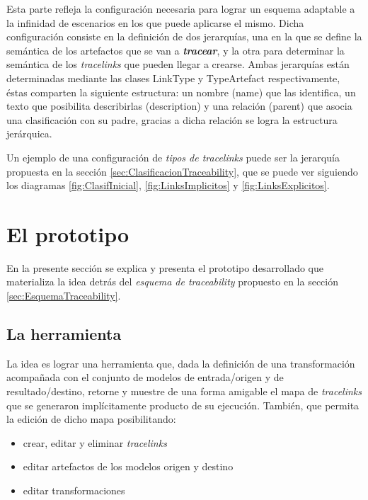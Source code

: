 \documentclass[a4paper,12pt,twoside,spanish,openright]{book}
\begin{document}
Esta parte refleja la configuración necesaria para lograr un esquema adaptable a la infinidad de escenarios en los que puede aplicarse el mismo. Dicha configuración consiste en la definición de dos jerarquías, una en la que se define la semántica de los artefactos que se van a \textit{\textbf{tracear}}, y la otra para determinar la semántica de los \textit{tracelinks} que pueden llegar a crearse. Ambas jerarquías están determinadas mediante las clases \textsf{LinkType} y \textsf{TypeArtefact} respectivamente, éstas comparten la siguiente estructura: un nombre (\textsf{name}) que las identifica, un texto que posibilita describirlas (\textsf{description}) y una relación (\textsf{parent}) que asocia una clasificación con su padre, gracias a dicha relación se logra la estructura jerárquica.

Un ejemplo de una configuración de \textit{tipos de tracelinks} puede ser la jerarquía propuesta en la sección \ref{sec:ClasificacionTraceability}, que se puede ver siguiendo los diagramas \ref{fig:ClasifInicial}, \ref{fig:LinksImplicitos} y \ref{fig:LinksExplicitos}.




\section{El prototipo}

En la presente sección se explica y presenta el prototipo desarrollado que materializa la idea detrás del \textit{esquema de traceability} propuesto en la sección \ref{sec:EsquemaTraceability}.


\subsection{La herramienta}

La idea es lograr una herramienta que, dada la definición de una transformación acompañada con el conjunto de modelos de entrada/origen y de resultado/destino, retorne y muestre de una forma amigable el mapa de \textit{tracelinks} que se generaron implícitamente producto de su ejecución. También, que permita la edición de dicho mapa posibilitando:
\begin{itemize}
\item crear, editar y eliminar \textit{tracelinks}
\item editar artefactos de los modelos origen y destino
\item editar transformaciones
\end{itemize}
\end{document}
